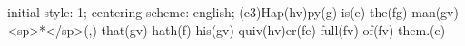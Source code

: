 initial-style: 1;
centering-scheme: english;
(c3)Hap(hv)py(g) is(e) the(fg) man(gv) <sp>*</sp>(,) that(gv) hath(f) his(gv) quiv(hv)er(fe) full(fv) of(fv) them.(e)

